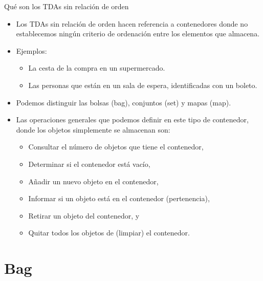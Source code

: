 \documentclass[10pt,envcountsect,spanish]{beamer}
\begin{document}
\begin{frame}{Qué son los TDAs sin relación de orden}

\begin{itemize}%

\item Los TDAs sin relación de orden hacen referencia a contenedores donde no establecemos ningún criterio de ordenación entre los elementos que almacena. 

\item Ejemplos:
	\begin{itemize}
	\item La cesta de la compra en un supermercado.
	\item Las personas que están en un sala de espera, identificadas con un boleto.
	\end{itemize}

\item Podemos distinguir las bolsas (bag), conjuntos (set) y mapas (map).

\item Las operaciones generales que podemos definir en este tipo de contenedor, donde los objetos simplemente se almacenan son:
\begin{itemize}
\item Consultar el número de objetos que tiene el contenedor,
\item Determinar si el contenedor está vacío,
\item Añadir un nuevo objeto en el contenedor,
\item Informar si un objeto está en el contenedor (pertenencia),
\item Retirar un objeto del contenedor, y
\item Quitar todos los objetos de (limpiar) el contenedor.
\end{itemize}

\end{itemize}

\end{frame}



\section{Bag}
\end{document}
